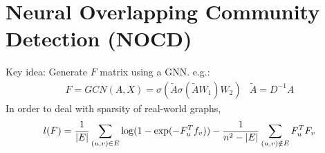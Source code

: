 \section{Neural Overlapping Community Detection (NOCD)}
Key idea: Generate $F$ matrix using a GNN. e.g.: 
    \begin{align*}
        F= GCN(A,X) = \sigma(\tilde{A}\sigma(\tilde{A}W_1)W_2) & \tilde{A} = D^{-1}A
    \end{align*}
In order to deal with sparsity of real-world graphs, 
    \begin{align*}
        l(F) = \frac{1}{\left| E \right|} \sum_{(u,v)\in E} \log(1 - \exp(-F_u^Tf_v)) - \frac{1}{n^2 - \left| E \right|} \sum_{(u,v)\notin E}F_u^T F_v
    \end{align*}